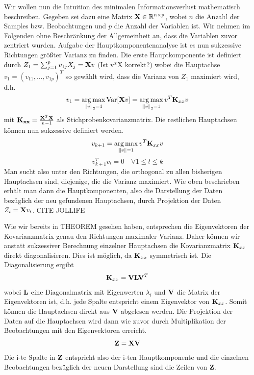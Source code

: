 Wir wollen nun die Intuition des minimalen Informationsverlust mathematisch beschreiben. Gegeben sei dazu eine Matrix $\mathbf{X} \in \mathbb{R}^{n\times p}$, wobei $n$ die Anzahl der Samples bzw. Beobachtungen und $p$ die Anzahl der Variablen ist. Wir nehmen im Folgenden ohne Beschränkung der Allgemeinheit an, dass die Variablen zuvor zentriert wurden. Aufgabe der Hauptkomponentenanalyse ist es nun sukzessive Richtungen größter Varianz zu finden. Die erste Hauptkomponente ist definiert durch $Z_1 = \sum_{j=1}^p v_{1j}X_j = \mathbf{X}v$ (Ist v*X korrekt?) wobei die Hauptachse $v_1 = (v_{11}, \ldots, v_{1p})^T$ so gewählt wird, dass die Varianz von $Z_1$ maximiert wird, d.h.
$$v_1 = \operatorname*{arg\,max}_{\left\lVert v \right\rVert_2 = 1} \text{Var}[\mathbf{X}v] = \operatorname*{arg\,max}_{\left\lVert v \right\rVert_2 = 1} v^T \mathbf{K}_{xx} v$$
mit $\mathbf{K_{xx}} = \frac{\mathbf{X}^T\mathbf{X}}{n-1}$ als Stichprobenkovarianzmatrix. Die restlichen Hauptachsen können nun sukzessive definiert werden.
$$v_{k+1} = \operatorname*{arg\,max}_{\left\lVert v \right\rVert = 1} v^T \mathbf{K}_{xx} v$$ 
$$v_{k+1}^Tv_l = 0 \quad \forall 1 \leq l \leq k$$
Man sucht also unter den Richtungen, die orthogonal zu allen bisherigen Hauptachsen sind, diejenige, die die Varianz maximiert. Wie oben beschrieben erhält man dann die Hauptkomponenten, also die Darstellung der Daten bezüglich der neu gefundenen Hauptachsen, durch Projektion der Daten $Z_i = \mathbf{X}v_i$.
\cite{zou_overview}
CITE JOLLIFE

Wie wir bereits in THEOREM gesehen haben, entsprechen die Eigenvektoren der Kovarianzmatrix genau den Richtungen maximaler Varianz. Daher können wir anstatt sukzessiver Berechnung einzelner Hauptachsen die Kovarianzmatrix $\mathbf{K}_{xx}$ direkt diagonalisieren. Dies ist möglich, da $\mathbf{K}_{xx}$ symmetrisch ist. Die Diagonalisierung ergibt
$$\mathbf{K}_{xx} = \mathbf{V} \mathbf{L} \mathbf{V}^T$$
wobei $\mathbf{L}$ eine Diagonalmatrix mit Eigenwerten $\lambda_i$ und $\mathbf{V}$ die Matrix der Eigenvektoren ist, d.h. jede Spalte entspricht einem Eigenvektor von $\mathbf{K}_{xx}$. Somit können die Hauptachsen direkt aus $\mathbf{V}$ abgelesen werden. Die Projektion der Daten auf die Hauptachsen wird dann wie zuvor durch Multiplikation der Beobachtungen mit den Eigenvektoren erreicht. 
$$\mathbf{Z} = \mathbf{X} \mathbf{V}$$
Die i-te Spalte in $\mathbf{Z}$ entspricht also der i-ten Hauptkomponente und die einzelnen Beobachtungen bezüglich der neuen Darstellung sind die Zeilen von $\mathbf{Z}$.


